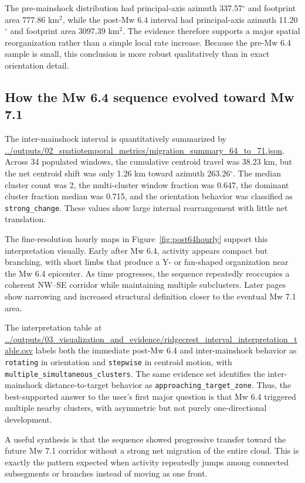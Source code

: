 \documentclass[11pt]{article}
\begin{document}
The pre-mainshock distribution had principal-axis azimuth 337.57$^{\circ}$ and footprint area 777.86 km$^2$, while the post-Mw 6.4 interval had principal-axis azimuth 11.20$^{\circ}$ and footprint area 3097.39 km$^2$. The evidence therefore supports a major spatial reorganization rather than a simple local rate increase. Because the pre-Mw 6.4 sample is small, this conclusion is more robust qualitatively than in exact orientation detail.

\subsection{How the Mw 6.4 sequence evolved toward Mw 7.1}
The inter-mainshock interval is quantitatively summarized by
\url{../outputs/02_spatiotemporal_metrics/migration_summary_64_to_71.json}.
Across 34 populated windows, the cumulative centroid travel was 38.23 km, but the net centroid shift was only 1.26 km toward azimuth 263.26$^{\circ}$. The median cluster count was 2, the multi-cluster window fraction was 0.647, the dominant cluster fraction median was 0.715, and the orientation behavior was classified as \texttt{strong\_change}. These values show large internal rearrangement with little net translation.

The fine-resolution hourly maps in Figure~\ref{fig:post64hourly} support this interpretation visually. Early after Mw 6.4, activity appears compact but branching, with short limbs that produce a Y- or fan-shaped organization near the Mw 6.4 epicenter. As time progresses, the sequence repeatedly reoccupies a coherent NW--SE corridor while maintaining multiple subclusters. Later pages show narrowing and increased structural definition closer to the eventual Mw 7.1 area.

The interpretation table at
\url{../outputs/03_visualization_and_evidence/ridgecrest_interval_interpretation_table.csv}
labels both the immediate post-Mw 6.4 and inter-mainshock behavior as \texttt{rotating} in orientation and \texttt{stepwise} in centroid motion, with \texttt{multiple\_simultaneous\_clusters}. The same evidence set identifies the inter-mainshock distance-to-target behavior as \texttt{approaching\_target\_zone}. Thus, the best-supported answer to the user's first major question is that Mw 6.4 triggered multiple nearby clusters, with asymmetric but not purely one-directional development.

A useful synthesis is that the sequence showed progressive transfer toward the future Mw 7.1 corridor without a strong net migration of the entire cloud. This is exactly the pattern expected when activity repeatedly jumps among connected subsegments or branches instead of moving as one front.
\end{document}
